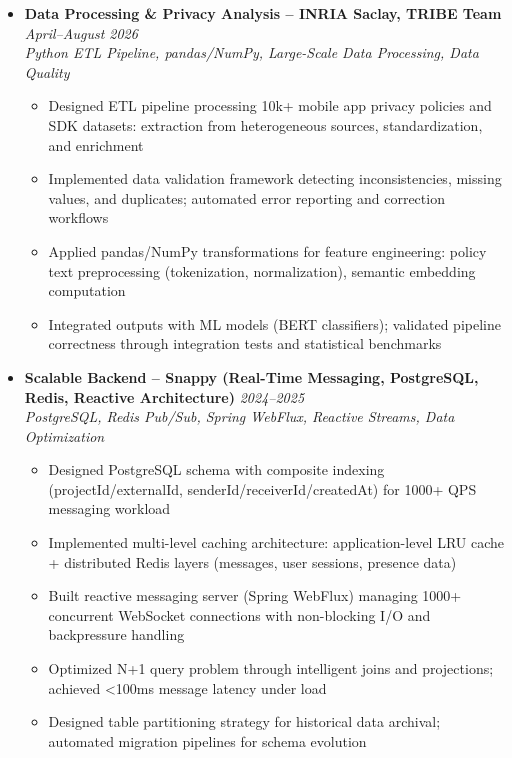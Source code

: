 \documentclass[a4paper,11pt]{article}
\begin{document}
\begin{itemize}[leftmargin=*, label={-}]

\item \textbf{Data Processing \& Privacy Analysis -- INRIA Saclay, TRIBE Team} \hfill \textit{April--August 2026} \\
\textit{Python ETL Pipeline, pandas/NumPy, Large-Scale Data Processing, Data Quality} \vspace{-2pt}
    \begin{itemize}[leftmargin=0.4cm, nosep, label=\tiny$\bullet$]
        \item Designed ETL pipeline processing 10k+ mobile app privacy policies and SDK datasets: extraction from heterogeneous sources, standardization, and enrichment
        \item Implemented data validation framework detecting inconsistencies, missing values, and duplicates; automated error reporting and correction workflows
        \item Applied pandas/NumPy transformations for feature engineering: policy text preprocessing (tokenization, normalization), semantic embedding computation
        \item Integrated outputs with ML models (BERT classifiers); validated pipeline correctness through integration tests and statistical benchmarks
    \end{itemize}

\item \textbf{Scalable Backend -- Snappy (Real-Time Messaging, PostgreSQL, Redis, Reactive Architecture)} \hfill \textit{2024--2025} \\
\textit{PostgreSQL, Redis Pub/Sub, Spring WebFlux, Reactive Streams, Data Optimization} \vspace{-2pt}
    \begin{itemize}[leftmargin=0.4cm, nosep, label=\tiny$\bullet$]
        \item Designed PostgreSQL schema with composite indexing (projectId/externalId, senderId/receiverId/createdAt) for 1000+ QPS messaging workload
        \item Implemented multi-level caching architecture: application-level LRU cache + distributed Redis layers (messages, user sessions, presence data)
        \item Built reactive messaging server (Spring WebFlux) managing 1000+ concurrent WebSocket connections with non-blocking I/O and backpressure handling
        \item Optimized N+1 query problem through intelligent joins and projections; achieved <100ms message latency under load
        \item Designed table partitioning strategy for historical data archival; automated migration pipelines for schema evolution
    \end{itemize}


\end{itemize}
\end{document}

